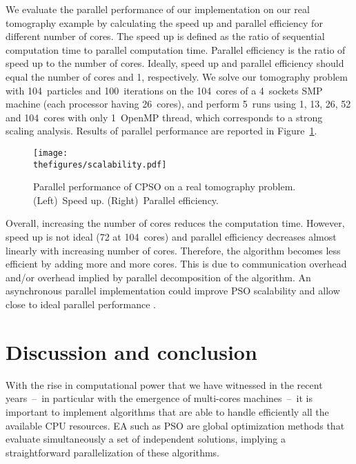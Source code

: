 We evaluate the parallel performance of our implementation on our real tomography example by calculating the speed up and parallel efficiency for different number of {\color{\revision}cores}. The speed up is defined as the ratio of sequential computation time to parallel computation time. Parallel efficiency is the ratio of speed up to the number of {\color{\revision}cores}. Ideally, speed up and parallel efficiency should equal the number of {\color{\revision}cores} and 1, respectively. We solve our tomography problem with 104~particles and 100~iterations on {\color{\revision}the 104~cores of a 4~sockets SMP machine (each processor having 26~cores)}, and perform 5~runs using 1, 13, 26, 52 and {\color{\revision}104~cores with only 1~OpenMP thread, which corresponds to a strong scaling analysis}. Results of parallel performance are reported in Figure~\ref{fig:scalability}.

\begin{figure}[!htbp]
	\centering
	\texttt{[image: \\thefigures/scalability.pdf]}
	\caption{Parallel performance of CPSO on a real tomography problem. (Left)~Speed up. (Right)~Parallel efficiency.}
	\label{fig:scalability}
\end{figure}

Overall, increasing the number of {\color{\revision}cores} reduces the computation time. However, speed up is not ideal {\color{\revision}(72 at 104~cores)} and parallel efficiency decreases almost linearly with increasing number of {\color{\revision}cores}. Therefore, the algorithm becomes less efficient by adding more and more {\color{\revision}cores}. This is due to communication overhead and/or overhead implied by parallel decomposition of the algorithm. An asynchronous parallel implementation could improve PSO scalability and allow close to ideal parallel performance \citep{Koh2006, Venter2006, Mussi2011}.


\section{Discussion and conclusion}
\label{sec:discussion_and_conclusion}

With the rise in computational power that we have witnessed in the recent years~--~in particular with the emergence of multi-cores machines~--~it is important to implement algorithms that are able to handle efficiently all the available CPU resources. EA such as PSO are global optimization methods that evaluate simultaneously a set of independent solutions, implying a straightforward parallelization of these algorithms.


